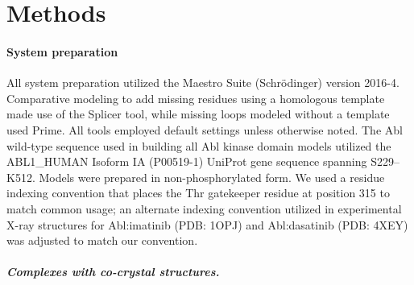 \documentclass[phd,tocprelim]{cornell}
\begin{document}
\section{Methods}
\label{sec:methods}

\paragraph{System preparation}
All system preparation utilized the Maestro Suite (Schr\"{o}dinger) version 2016-4. 
Comparative modeling to add missing residues using a homologous template made use of the Splicer tool, while missing loops modeled without a template used Prime. 
All tools employed default settings unless otherwise noted.
The Abl wild-type sequence used in building all Abl kinase domain models utilized the ABL1\_HUMAN Isoform IA (P00519-1) UniProt gene sequence spanning S229--K512.
Models were prepared in non-phosphorylated form.
We used a residue indexing convention that places the Thr gatekeeper residue at position 315 to match common usage; an alternate indexing convention utilized in experimental X-ray structures for Abl:imatinib (PDB: 1OPJ) \citep{Nagar:Cell:2003} and Abl:dasatinib (PDB: 4XEY) \citep{Lorenz:Biochem.J.:2015} was adjusted to match our convention. 

\subparagraph{Complexes with co-crystal structures.}
\end{document}

